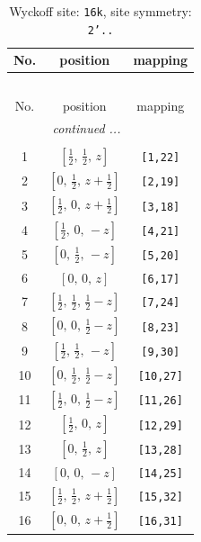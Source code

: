 \documentclass[fleqn,8pt]{jsarticle}
\begin{document}
\begin{longtable}{ccc}
\caption{Wyckoff site: {\tt 16k}, site symmetry: {\tt 2'..}}
 \\
 \hline \hline
No. & position & mapping \\ \hline \endfirsthead

\multicolumn{2}{l}{\tablename\ \thetable{}} \\
 \hline \hline
No. & position & mapping \\ \hline \endhead

 \hline \hline
\multicolumn{2}{r}{\footnotesize\it continued ...} \\ \endfoot

 \hline \hline
\multicolumn{2}{r}{} \\ \endlastfoot

1 & $\left[ \frac{1}{2},\, \frac{1}{2},\, z \right]$ & {\tt [1,22]} \\ \hline
2 & $\left[ 0,\, \frac{1}{2},\, z + \frac{1}{2} \right]$ & {\tt [2,19]} \\ \hline
3 & $\left[ \frac{1}{2},\, 0,\, z + \frac{1}{2} \right]$ & {\tt [3,18]} \\ \hline
4 & $\left[ \frac{1}{2},\, 0,\, - z \right]$ & {\tt [4,21]} \\ \hline
5 & $\left[ 0,\, \frac{1}{2},\, - z \right]$ & {\tt [5,20]} \\ \hline
6 & $\left[ 0,\, 0,\, z \right]$ & {\tt [6,17]} \\ \hline
7 & $\left[ \frac{1}{2},\, \frac{1}{2},\, \frac{1}{2} - z \right]$ & {\tt [7,24]} \\ \hline
8 & $\left[ 0,\, 0,\, \frac{1}{2} - z \right]$ & {\tt [8,23]} \\ \hline
9 & $\left[ \frac{1}{2},\, \frac{1}{2},\, - z \right]$ & {\tt [9,30]} \\ \hline
10 & $\left[ 0,\, \frac{1}{2},\, \frac{1}{2} - z \right]$ & {\tt [10,27]} \\ \hline
11 & $\left[ \frac{1}{2},\, 0,\, \frac{1}{2} - z \right]$ & {\tt [11,26]} \\ \hline
12 & $\left[ \frac{1}{2},\, 0,\, z \right]$ & {\tt [12,29]} \\ \hline
13 & $\left[ 0,\, \frac{1}{2},\, z \right]$ & {\tt [13,28]} \\ \hline
14 & $\left[ 0,\, 0,\, - z \right]$ & {\tt [14,25]} \\ \hline
15 & $\left[ \frac{1}{2},\, \frac{1}{2},\, z + \frac{1}{2} \right]$ & {\tt [15,32]} \\ \hline
16 & $\left[ 0,\, 0,\, z + \frac{1}{2} \right]$ & {\tt [16,31]} \\
\end{longtable}
\end{document}
